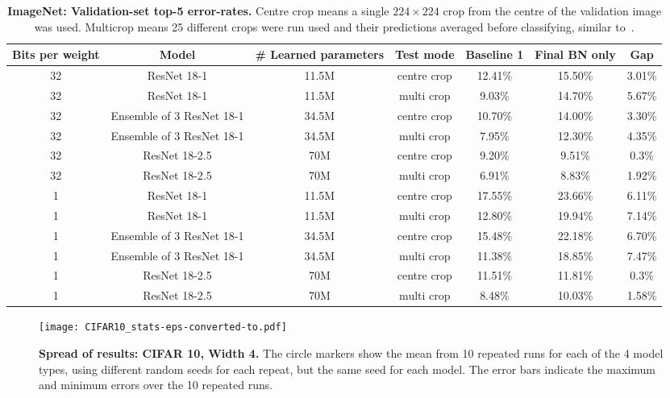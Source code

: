 \documentclass[conference]{IEEEtran}
\begin{document}
\begin{table*}[h]
\caption{{\bf ImageNet: Validation-set top-5 error-rates.} Centre crop means a single $224\times224$ crop from the centre of the validation image was used. Multicrop means 25 different crops were run used and their predictions averaged before classifying, similar to~\cite{He.16}.}\label{Table02}
\begin{center}
\footnotesize
\begin{tabular}{|c|c|c|c|c|c|c|}
\hline
{\bf Bits per weight} &{\bf Model} &{\bf \# Learned parameters} & {\bf Test mode} &  {\bf Baseline 1}  & {\bf Final BN only} &{\bf  Gap}\\
\hline
32& ResNet 18-1&11.5M& centre crop & 12.41\% & 15.50\% & 3.01\%\\
\hline
32& ResNet 18-1&11.5M& multi crop &  9.03\% & 14.70\% & 5.67\%\\
\hline
32& Ensemble of 3 ResNet 18-1&34.5M &centre crop & 10.70\% & 14.00\% & 3.30\%\\
\hline
32& Ensemble of 3 ResNet 18-1&34.5M& multi crop & 7.95\% & 12.30\% & 4.35\%\\
\hline
32& ResNet 18-2.5 &70M& centre crop & {{9.20\%}} & 9.51\% & 0.3\%\\
\hline
32& ResNet 18-2.5 &70M& multi crop &  {{6.91\%}} & 8.83\%& 1.92\%\\
\hline
\hline
1& ResNet 18-1&11.5M& centre crop & 17.55\%&23.66\% &6.11\%\\
\hline
1&ResNet 18-1&11.5M& multi crop &12.80\% &19.94\%&7.14\%\\
\hline
1&Ensemble of 3 ResNet 18-1&34.5M &centre crop &15.48\% &22.18\% &6.70\%\\
\hline
1&Ensemble of 3 ResNet 18-1&34.5M& multi crop &11.38\% &18.85\%&7.47\%\\
\hline
1&ResNet 18-2.5&70M& centre crop & {{11.51\%}}  & 11.81\%&0.3\% \\
\hline
1&ResNet 18-2.5 &70M&  multi crop &  {{8.48\%}}  &10.03\% &1.58\% \\
\hline
\end{tabular}
\end{center}
\end{table*}


\begin{figure}[h]
\begin{center}
{\texttt{[image: CIFAR10\_stats-eps-converted-to.pdf]}}
\end{center}
\caption{{\bf  Spread of results: CIFAR 10, Width 4.} The circle markers show the mean from 10 repeated runs for each of the 4 model types, using different random seeds for each repeat, but the same seed for each model. The error bars indicate the maximum and minimum errors over the 10 repeated runs.}\label{fig:res1}
\end{figure}
\end{document}
